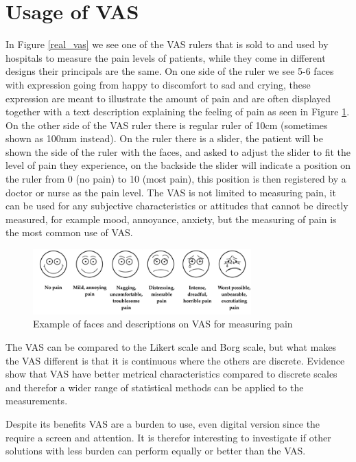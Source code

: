 \section{Usage of VAS}
In Figure \ref{real_vas} we see one of the VAS rulers that is sold to and used by hospitals to measure the pain levels of patients, while they come in different designs their principals are the same. On one side of the ruler we see 5-6 faces with expression going from happy to discomfort to sad and crying, these expression are meant to illustrate the amount of pain and are often displayed together with a text description explaining the feeling of pain as seen in Figure \ref{vas_faces}. On the other side of the VAS ruler there is regular ruler of 10cm (sometimes shown as 100mm instead). On the ruler there is a slider, the patient will be shown the side of the ruler with the faces, and asked to adjust the slider to fit the level of pain they experience, on the backside the slider will indicate a position on the ruler from 0 (no pain) to 10 (most pain), this position is then registered by a doctor or nurse as the pain level. The VAS is not limited to measuring pain, it can be used for any subjective characteristics or attitudes that cannot be directly measured, for example mood, annoyance, anxiety, but the measuring of pain is the most common use of VAS.

\begin{figure}[h!]
    \centering
    \includegraphics[width=0.75\textwidth]{figures/vas_faces.png}
    \caption{Example of faces and descriptions on VAS for measuring pain\cite{vas_faces}}
    \label{vas_faces}
\end{figure}

The VAS can be compared to the Likert scale\cite{likert} and Borg scale\cite{borg_scale}, but what makes the VAS different is that it is continuous where the others are discrete. Evidence show that VAS have better metrical characteristics compared to discrete scales and therefor a wider range of statistical methods can be applied to the measurements\cite{best_scale}.

Despite its benefits VAS are a burden to use, even digital version since the require a screen and attention. It is therefor interesting to investigate if other solutions with less burden can perform equally or better than the VAS.








